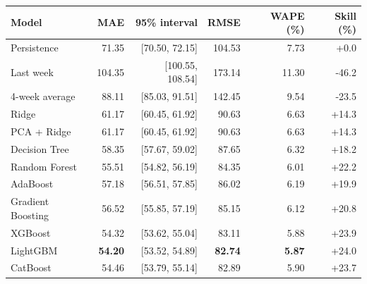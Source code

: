 \begin{tabular}{lrrrrr}
\toprule
Model & MAE & 95\% interval & RMSE & WAPE (\%) & Skill (\%) \\
\midrule
Persistence & 71.35 & {\small [70.50, 72.15]} & 104.53 & 7.73 & +0.0 \\
Last week & 104.35 & {\small [100.55, 108.54]} & 173.14 & 11.30 & -46.2 \\
4-week average & 88.11 & {\small [85.03, 91.51]} & 142.45 & 9.54 & -23.5 \\
\midrule
Ridge & 61.17 & {\small [60.45, 61.92]} & 90.63 & 6.63 & +14.3 \\
PCA + Ridge & 61.17 & {\small [60.45, 61.92]} & 90.63 & 6.63 & +14.3 \\
Decision Tree & 58.35 & {\small [57.67, 59.02]} & 87.65 & 6.32 & +18.2 \\
Random Forest & 55.51 & {\small [54.82, 56.19]} & 84.35 & 6.01 & +22.2 \\
AdaBoost & 57.18 & {\small [56.51, 57.85]} & 86.02 & 6.19 & +19.9 \\
Gradient Boosting & 56.52 & {\small [55.85, 57.19]} & 85.15 & 6.12 & +20.8 \\
XGBoost & 54.32 & {\small [53.62, 55.04]} & 83.11 & 5.88 & +23.9 \\
LightGBM & \textbf{54.20} & {\small [53.52, 54.89]} & \textbf{82.74} & \textbf{5.87} & +24.0 \\
CatBoost & 54.46 & {\small [53.79, 55.14]} & 82.89 & 5.90 & +23.7 \\
\bottomrule
\end{tabular}
